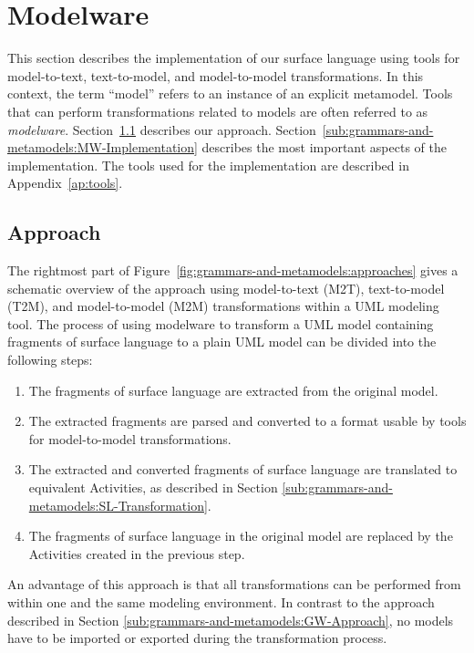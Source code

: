 \section{Modelware}
\label{sec:grammars-and-metamodels:Modelware}

This section describes the implementation of our surface language using tools for model-to-text, text-to-model, and model-to-model transformations.
In this context, the term ``model'' refers to an instance of an explicit metamodel.
Tools that can perform transformations related to models are often referred to as \emph{modelware}.
Section~\ref{sub:grammars-and-metamodels:MW-Approach} describes our approach.
Section~\ref{sub:grammars-and-metamodels:MW-Implementation} describes the most important aspects of the implementation.
The tools used for the implementation are described in Appendix~\ref{ap:tools}.


\subsection{Approach}
\label{sub:grammars-and-metamodels:MW-Approach}

The rightmost part of Figure~\ref{fig:grammars-and-metamodels:approaches} gives a schematic overview of the approach using model-to-text (M2T), text-to-model (T2M), and model-to-model (M2M) transformations within a UML modeling tool.
The process of using modelware to transform a UML model containing fragments of surface language to a plain UML model can be divided into the following steps:
\begin{enumerate}
\item The fragments of surface language are extracted from the original model.
\item The extracted fragments are parsed and converted to a format usable by tools for model-to-model transformations.
\item The extracted and converted fragments of surface language are translated to equivalent Activities, as described in Section \ref{sub:grammars-and-metamodels:SL-Transformation}.
\item The fragments of surface language in the original model are replaced by the Activities created in the previous step.
\end{enumerate}
An advantage of this approach is that all transformations can be performed from within one and the same modeling environment.
In contrast to the approach described in Section \ref{sub:grammars-and-metamodels:GW-Approach}, no models have to be imported or exported during the transformation process.


